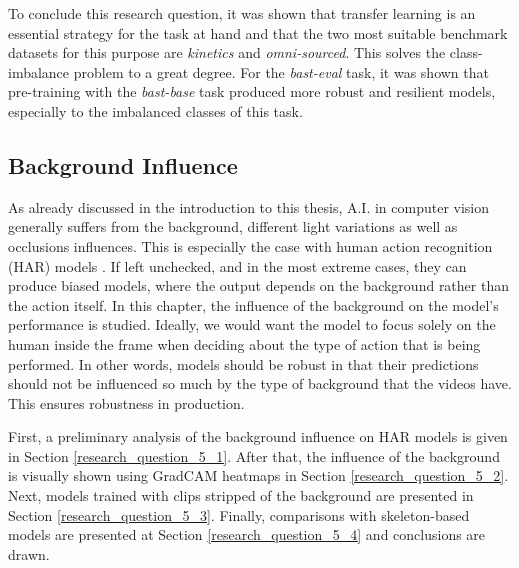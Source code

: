 \documentclass[extern,palatino]{cgMA}
\begin{document}
\bigskip
\noindent To conclude this research question, it was shown that transfer learning is an essential strategy for the task at hand and that the two most suitable benchmark datasets for this purpose are \textit{kinetics} and \textit{omni-sourced}. This solves the class-imbalance problem to a great degree. For the \textit{bast-eval} task, it was shown that pre-training with the \textit{bast-base} task produced more robust and resilient models, especially to the imbalanced classes of this task.

\newpage
\subsection{Background Influence}
\label{research_question_5}


\bigksip
\bigskip
\noindent As already discussed in the introduction to this thesis, A.I. in computer vision generally suffers from the background, different light variations as well as occlusions influences. This is especially the case with human action recognition (HAR) models \cite{pareek2021survey}. If left unchecked, and in the most extreme cases, they can produce biased models, where the output depends on the background rather than the action itself. In this chapter, the influence of the background on the model's performance is studied. Ideally, we would want the model to focus solely on the human inside the frame when deciding about the type of action that is being performed. In other words, models should be robust in that their predictions should not be influenced so much by the type of background that the videos have. This ensures robustness in production.

First, a preliminary analysis of the background influence on HAR models is given in Section \ref{research_question_5_1}. After that, the influence of the background is visually shown using GradCAM heatmaps in Section \ref{research_question_5_2}. Next, models trained with clips stripped of the background are presented in Section \ref{research_question_5_3}. Finally, comparisons with skeleton-based models are presented at Section \ref{research_question_5_4} and conclusions are drawn.
\end{document}
